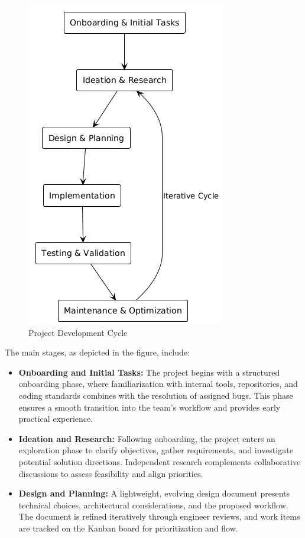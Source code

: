 \begin{spacing}{1.2}
\begin{figure}[H]
    \centering
    \includegraphics[scale=0.5]{Images/dev_process.png}
    \caption{Project Development Cycle}
    \label{fig:development_cycle}
\end{figure}

The main stages, as depicted in the figure, include:

\begin{itemize}
    \item \textbf{Onboarding and Initial Tasks:} The project begins with a structured onboarding phase, where familiarization with internal tools, repositories, and coding standards combines with the resolution of assigned bugs. This phase ensures a smooth transition into the team's workflow and provides early practical experience.

    \item \textbf{Ideation and Research:} Following onboarding, the project enters an exploration phase to clarify objectives, gather requirements, and investigate potential solution directions. Independent research complements collaborative discussions to assess feasibility and align priorities.

    \item \textbf{Design and Planning:} A lightweight, evolving design document presents technical choices, architectural considerations, and the proposed workflow. The document is refined iteratively through engineer reviews, and work items are tracked on the Kanban board for prioritization and flow.


\end{itemize}
\end{spacing}
